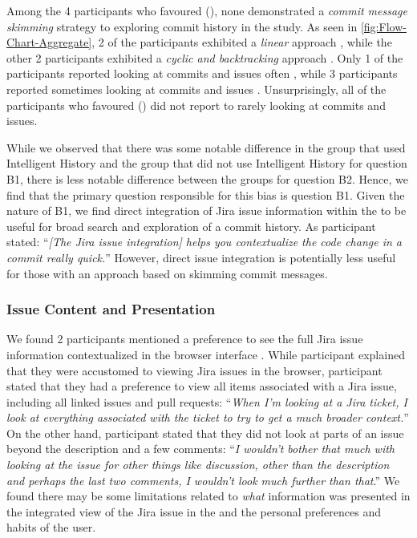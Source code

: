 Among the 4 participants who favoured (), none demonstrated a 
\textit{commit message skimming} strategy to exploring commit history in the study.
As seen in \autoref{fig:Flow-Chart-Aggregate}, 2 of the participants exhibited 
a \textit{linear} approach , 
while the other 2 participants exhibited a \textit{cyclic and backtracking} approach .
Only 1 of the participants reported looking at commits and issues often ,
while 3 participants reported sometimes looking at commits and issues .
Unsurprisingly, all of the participants who favoured () 
did not report to rarely looking at commits and issues.

While we observed that there was some notable difference in the group that used Intelligent History 
and the group that did not use Intelligent History for question B1,
there is less notable difference between the groups for question B2.
Hence, we find that the primary question responsible for this bias is question B1.
Given the nature of B1, we find direct integration of Jira issue information within the  
to be useful for broad search and exploration of a commit history.
As participant  stated:
``\textit{[The Jira issue integration] helps you contextualize the code change in a commit really quick.}''
However, direct issue integration is potentially less useful for those with an approach based on skimming commit messages.

\subsubsection{Issue Content and Presentation}

We found 2 participants mentioned a preference to see the full Jira issue information contextualized in the browser interface .
While participant  explained that they were accustomed to viewing Jira issues in the browser,
participant  stated that they had a preference to view all items associated with a Jira issue, including all linked issues and pull requests:
``\textit{When I’m looking at a Jira ticket, I look at everything associated with the ticket to try to get a much broader context.}''
On the other hand,
participant  stated that they did not look at parts of an issue beyond the description and a few comments:
``\textit{I wouldn’t bother that much with looking at the issue for other things like discussion, other than the description and perhaps the last two comments, 
I wouldn’t look much further than that}.''
We found there may be some limitations related to \emph{what} information was presented in the integrated view of the Jira issue in the 
and the personal preferences and habits of the user.

